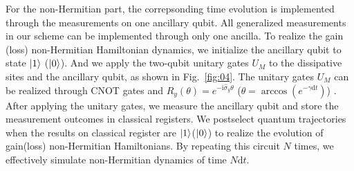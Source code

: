 \documentclass[longbibliography, aps, prx, amsmath, amssymb, amsfonts, twocolumn,superscriptaddress, footinbib]{revtex4-1}
\begin{document}
    {}

	For the non-Hermitian part, the correpsonding time evolution is implemented through the measurements on one ancillary qubit. 
	All generalized measurements in our scheme can be implemented through only one ancilla. To realize the gain (loss) non-Hermitian Hamiltonian dynamics, we initialize the ancillary qubit to state $\ket{1}$ ($\ket{0}$). And we apply the two-qubit unitary gates $U_M$ to the dissipative sites and the ancillary qubit, as shown in Fig.~\ref{fig:04}. The unitary gates $U_M$ can be realized through CNOT gates and $R_y(\theta) = e^{-\mathrm{i} \hat{\sigma}_y \theta}$ ($\theta = \arccos(e^{-\gamma \mathrm{d}t})$) {\color{blue}{gates}}.
	After applying the unitary gates, we measure the ancillary qubit and store the measurement outcomes in classical registers. 
	We postselect quantum trajectories when the results on classical register are $\ket{1}$($\ket{0}$) to realize the evolution of gain(loss) non-Hermitian Hamiltonians. By repeating this circuit $N$ times, we effectively simulate non-Hermitian dynamics of time $N\mathrm{d}t$. {}
\end{document}
